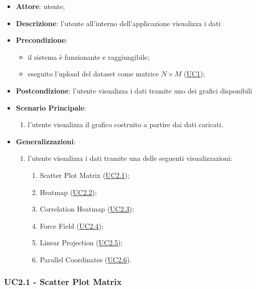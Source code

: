     \begin{itemize}
    \item \textbf{Attore}: utente;
    \item \textbf{Descrizione}: l'utente all'interno dell'applicazione visualizza i dati
    \item \textbf{Precondizione}:
    \begin{itemize}
        \item il sistema è funzionante e raggiungibile;
        \item eseguito l'upload del dataset come matrice $N\times M$ (\hyperref[uc1]{UC1});
    \end{itemize}
    \item \textbf{Postcondizione}: l'utente visualizza i dati tramite uno dei grafici disponibili
    \item \textbf{Scenario Principale}: 
        \begin{enumerate}
            \item l'utente visualizza il grafico costruito a partire dai dati caricati.
        \end{enumerate}  
    \item \textbf{Generalizzazioni}:
        \begin{enumerate}
            \item l'utente visualizza i dati tramite una delle seguenti visualizzazioni:
                \begin{enumerate}
                    \item Scatter Plot Matrix (\hyperref[uc2.1]{UC2.1});
                    \item Heatmap (\hyperref[uc2.2]{UC2.2});
                    \item Correlation Heatmap (\hyperref[uc2.3]{UC2.3});
                    \item Force Field (\hyperref[uc2.4]{UC2.4});
                    \item Linear Projection (\hyperref[uc2.5]{UC2.5});
                    \item Parallel Coordinates (\hyperref[uc2.6]{UC2.6}).
                \end{enumerate}
        \end{enumerate}  
    \end{itemize}
    
    \subsubsection{UC2.1 - Scatter Plot Matrix}
    \label{uc2.1}
    
